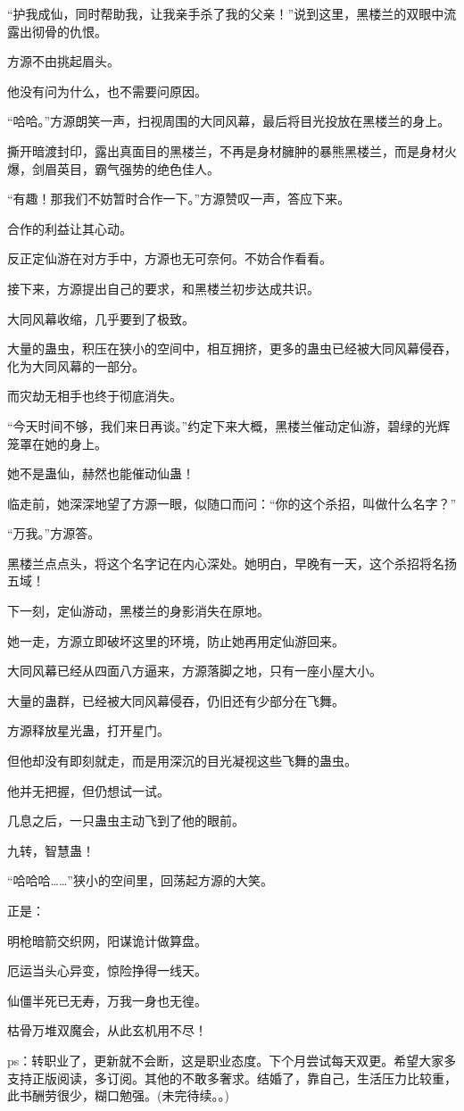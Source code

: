 \begin{this_body}
“护我成仙，同时帮助我，让我亲手杀了我的父亲！”说到这里，黑楼兰的双眼中流露出彻骨的仇恨。

方源不由挑起眉头。

他没有问为什么，也不需要问原因。

“哈哈。”方源朗笑一声，扫视周围的大同风幕，最后将目光投放在黑楼兰的身上。

撕开暗渡封印，露出真面目的黑楼兰，不再是身材臃肿的暴熊黑楼兰，而是身材火爆，剑眉英目，霸气强势的绝色佳人。

“有趣！那我们不妨暂时合作一下。”方源赞叹一声，答应下来。

合作的利益让其心动。

反正定仙游在对方手中，方源也无可奈何。不妨合作看看。

接下来，方源提出自己的要求，和黑楼兰初步达成共识。

大同风幕收缩，几乎要到了极致。

大量的蛊虫，积压在狭小的空间中，相互拥挤，更多的蛊虫已经被大同风幕侵吞，化为大同风幕的一部分。

而灾劫无相手也终于彻底消失。

“今天时间不够，我们来日再谈。”约定下来大概，黑楼兰催动定仙游，碧绿的光辉笼罩在她的身上。

她不是蛊仙，赫然也能催动仙蛊！

临走前，她深深地望了方源一眼，似随口而问：“你的这个杀招，叫做什么名字？”

“万我。”方源答。

黑楼兰点点头，将这个名字记在内心深处。她明白，早晚有一天，这个杀招将名扬五域！

下一刻，定仙游动，黑楼兰的身影消失在原地。

她一走，方源立即破坏这里的环境，防止她再用定仙游回来。

大同风幕已经从四面八方逼来，方源落脚之地，只有一座小屋大小。

大量的蛊群，已经被大同风幕侵吞，仍旧还有少部分在飞舞。

方源释放星光蛊，打开星门。

但他却没有即刻就走，而是用深沉的目光凝视这些飞舞的蛊虫。

他并无把握，但仍想试一试。

几息之后，一只蛊虫主动飞到了他的眼前。

九转，智慧蛊！

“哈哈哈……”狭小的空间里，回荡起方源的大笑。

正是：

明枪暗箭交织网，阳谋诡计做算盘。

厄运当头心异变，惊险挣得一线天。

仙僵半死已无寿，万我一身也无徨。

枯骨万堆双魔会，从此玄机用不尽！

ps：转职业了，更新就不会断，这是职业态度。下个月尝试每天双更。希望大家多支持正版阅读，多订阅。其他的不敢多奢求。结婚了，靠自己，生活压力比较重，此书酬劳很少，糊口勉强。(未完待续。。)

\end{this_body}


